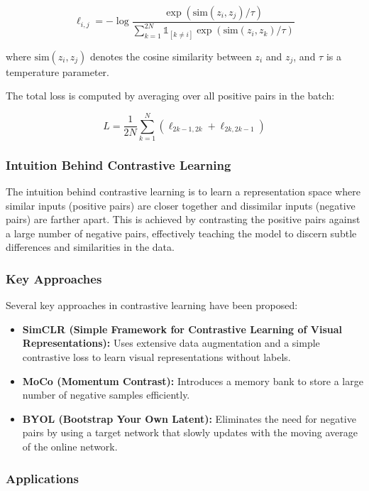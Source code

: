 \documentclass[12pt]{article}
\begin{document}
\[
\ell_{i,j} = -\log \frac{\exp(\text{sim}(z_i, z_j) / \tau)}{\sum_{k=1}^{2N} \mathbb{1}_{[k \neq i]} \exp(\text{sim}(z_i, z_k) / \tau)}
\]

where $\text{sim}(z_i, z_j)$ denotes the cosine similarity between $z_i$ and $z_j$, and $\tau$ is a temperature parameter.

The total loss is computed by averaging over all positive pairs in the batch:

\[
L = \frac{1}{2N} \sum_{k=1}^{N} \left( \ell_{2k-1, 2k} + \ell_{2k, 2k-1} \right)
\]

\subsubsection{Intuition Behind Contrastive Learning}

The intuition behind contrastive learning is to learn a representation space where similar inputs (positive pairs) are closer together and dissimilar inputs (negative pairs) are farther apart. This is achieved by contrasting the positive pairs against a large number of negative pairs, effectively teaching the model to discern subtle differences and similarities in the data.

\subsubsection{Key Approaches}

Several key approaches in contrastive learning have been proposed:

\begin{itemize}
    \item \textbf{SimCLR (Simple Framework for Contrastive Learning of Visual Representations):} Uses extensive data augmentation and a simple contrastive loss to learn visual representations without labels.
    \item \textbf{MoCo (Momentum Contrast):} Introduces a memory bank to store a large number of negative samples efficiently.
    \item \textbf{BYOL (Bootstrap Your Own Latent):} Eliminates the need for negative pairs by using a target network that slowly updates with the moving average of the online network.
\end{itemize}

\subsubsection{Applications}
\end{document}
